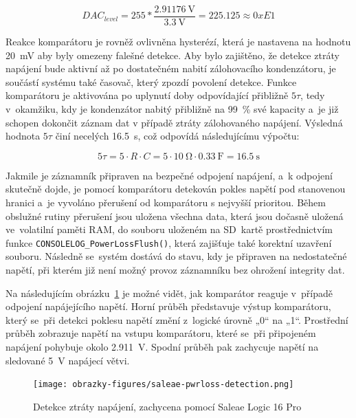 \[
    DAC_{level} = 255 * \frac{\SI{2.91176}{\volt}}{\SI{3.3}{\volt}} = 225.125 \approx  0xE1
\]

Reakce komparátoru je rovněž ovlivněna hysterézí, která je nastavena na hodnotu \SI{20}{\milli\volt} aby byly omezeny falešné detekce. Aby bylo zajištěno, že detekce ztráty napájení bude aktivní až po dostatečném nabití zálohovacího kondenzátoru, je součástí systému také časovač, který zpozdí povolení detekce. Funkce komparátoru je aktivována po uplynutí doby odpovídající přibližně $5\tau$, tedy v~okamžiku, kdy je kondenzátor nabitý přibližně na 99~\% své kapacity a~je již schopen dokončit záznam dat v případě ztráty zálohovaného napájení. Výsledná hodnota $5\tau$ činí necelých \SI{16.5}{\second}, což odpovídá následujícímu výpočtu:

\[
    5\tau = 5 \cdot R \cdot C = 5 \cdot \SI{10}{\ohm} \cdot \SI{0.33}{\farad} = \SI{16.5}{\second}
\]

Jakmile je záznamník připraven na bezpečné odpojení napájení, a~k odpojení skutečně dojde, je pomocí komparátoru detekován pokles napětí pod stanovenou hranici a~je vyvoláno přerušení od komparátoru s nejvyšší prioritou. Během obslužné rutiny přerušení jsou uložena všechna data, která jsou dočasně uložená ve~volatilní paměti RAM, do souboru uloženém na SD~kartě prostřednictvím funkce \texttt{CONSOLELOG\_PowerLossFlush()}, která zajišťuje také korektní uzavření souboru. Následně se~systém dostává do stavu, kdy je připraven na nedostatečné napětí, při kterém již není možný provoz záznamníku bez ohrožení integrity dat.

Na následujícím obrázku~\ref{fig:pwrloss-detection-saleae} je možné vidět, jak komparátor reaguje v~případě odpojení napájejícího napětí.  Horní průběh představuje výstup komparátoru, který se~při detekci poklesu napětí změní z~logické úrovně „0“ na „1“. Prostřední průběh zobrazuje napětí na vstupu komparátoru, které se~při připojeném napájení pohybuje okolo \SI{2.911}{\volt}. Spodní průběh pak zachycuje napětí na sledované \SI{5}{\volt} napájecí větvi.

\begin{figure}[h]
    \centering
    \texttt{[image: obrazky-figures/saleae-pwrloss-detection.png]}
    
    \caption{Detekce ztráty napájení, zachycena pomocí Saleae Logic 16 Pro}
    \label{fig:pwrloss-detection-saleae}
\end{figure}

\newpage

